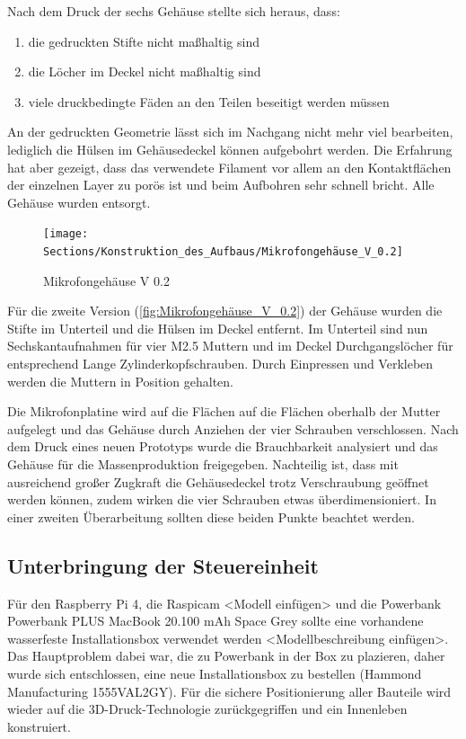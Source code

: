 Nach dem Druck der sechs Gehäuse stellte sich heraus, dass:

\begin{enumerate}
	\item die gedruckten Stifte nicht maßhaltig sind
	\item die Löcher im Deckel nicht maßhaltig sind
	\item viele druckbedingte Fäden an den Teilen beseitigt werden müssen
\end{enumerate}

An der gedruckten Geometrie lässt sich im Nachgang nicht mehr viel bearbeiten, lediglich die Hülsen im Gehäusedeckel können aufgebohrt werden. Die Erfahrung hat aber gezeigt, dass das verwendete Filament vor allem an den Kontaktflächen der einzelnen Layer zu porös ist und beim Aufbohren sehr schnell bricht. Alle Gehäuse wurden entsorgt.

\newpage

\begin{figure}[h]
	\begin{center}
		\texttt{[image: Sections/Konstruktion\_des\_Aufbaus/Mikrofongehäuse\_V\_0.2]}
	\end{center}
	\caption{Mikrofongehäuse V 0.2}
	\label{fig:Mikrofongehäuse_V_0.2}
\end{figure}

Für die zweite Version (\autoref{fig:Mikrofongehäuse_V_0.2}) der Gehäuse wurden die Stifte im Unterteil und die Hülsen im Deckel entfernt. Im Unterteil sind nun Sechskantaufnahmen für vier M2.5 Muttern und im Deckel Durchgangslöcher für entsprechend Lange Zylinderkopfschrauben. Durch Einpressen und Verkleben werden die Muttern in Position gehalten.

Die Mikrofonplatine wird auf die Flächen auf die Flächen oberhalb der Mutter aufgelegt und das Gehäuse durch Anziehen der vier Schrauben verschlossen. Nach dem Druck eines neuen Prototyps wurde die Brauchbarkeit analysiert und das Gehäuse für die Massenproduktion freigegeben. Nachteilig ist, dass mit ausreichend großer Zugkraft die Gehäusedeckel trotz Verschraubung geöffnet werden können, zudem wirken die vier Schrauben etwas überdimensioniert. In einer zweiten Überarbeitung sollten diese beiden Punkte beachtet werden.

\subsection{Unterbringung der Steuereinheit}

Für den Raspberry Pi 4, die Raspicam <Modell einfügen> und die Powerbank Powerbank PLUS MacBook 20.100 mAh Space Grey sollte eine vorhandene wasserfeste Installationsbox verwendet werden <Modellbeschreibung einfügen>. Das Hauptproblem dabei war, die zu Powerbank in der Box zu plazieren, daher wurde sich entschlossen, eine neue Installationsbox zu bestellen (Hammond Manufacturing 1555VAL2GY). Für die sichere Positionierung aller Bauteile wird wieder auf die 3D-Druck-Technologie zurückgegriffen und ein Innenleben konstruiert.

